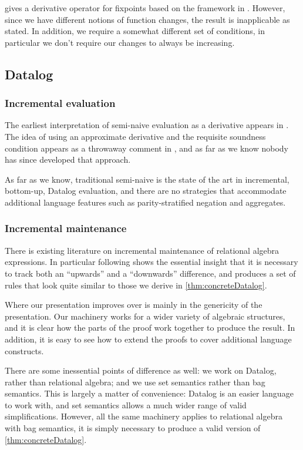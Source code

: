 \textcite{arntz2017fixpoints} gives a derivative operator for fixpoints based on
the framework in \textcite{cai2014changes}. However, since we have different
notions of function changes, the result is inapplicable as
stated. In addition, we require a somewhat different set of conditions, in particular we
don't require our changes to always be increasing.

\subsection{Datalog}

\subsubsection{Incremental evaluation}

The earliest interpretation of semi-naive evaluation as a derivative 
appears in \textcite{bancilhon1986naive}. The idea of using an approximate derivative
and the requisite soundness condition appears as a throwaway comment in
\textcite[][section 3.2.2]{bancilhon1986amateur}, and as far as we know nobody has since
developed that approach.

As far as we know, traditional semi-naive is the state of
the art in incremental, bottom-up, Datalog evaluation, and there are no strategies that
accommodate additional language features such as parity-stratified negation and aggregates.

\subsubsection{Incremental maintenance}

There is existing literature on incremental maintenance of relational algebra
expressions. In particular \textcite{griffin1997improved} following
\textcite{qian1991incremental} shows the essential insight that it is necessary to
track both an ``upwards'' and a ``downwards'' difference, and produces a set of
rules that look quite similar to those we derive in \cref{thm:concreteDatalog}.

Where our presentation improves over \citeauthor{griffin1997improved} is mainly in
the genericity of the presentation. Our machinery works for a wider variety of
algebraic structures, and it is clear how the parts of the proof work together
to produce the result. In addition, it is easy to see how to extend the proofs
to cover additional language constructs.

There are some inessential points of difference as well: we work on Datalog,
rather than relational algebra; and we use set semantics rather than bag
semantics. This is largely a matter of convenience: Datalog is an easier
language to work with, and set semantics allows a much wider range of valid
simplifications. However, all the same machinery applies to relational algebra
with bag semantics, it is simply necessary to produce a valid version of \cref{thm:concreteDatalog}.

